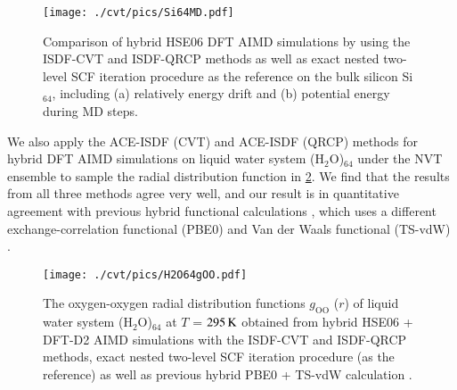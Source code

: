 \begin{figure}[htbp]
	\begin{center}
		\texttt{[image: ./cvt/pics/Si64MD.pdf]}
	\end{center}
	\caption{Comparison of hybrid HSE06 DFT AIMD simulations by using the 
	ISDF\hyp{}CVT and ISDF\hyp{}QRCP methods as well as exact nested 
	two\hyp{}level SCF iteration procedure as the reference on the bulk silicon
	Si$_{64}$, including (a) relatively energy drift and (b) potential energy
	during MD steps.} \label{fig:Si64MD}
\end{figure}
\FloatBarrier

We also apply the ACE\hyp{}ISDF (CVT) and ACE\hyp{}ISDF (QRCP) methods for
hybrid DFT AIMD simulations on liquid water system (H$_2$O)$_{64}$ under the NVT
ensemble to sample the radial distribution function in \cref{fig:H2O64gOO}. We
find that the results from all three methods agree very well, and our result is
in quantitative agreement with previous hybrid functional calculations
\cite{JCP_141_084502_2014}, which uses a different exchange\hyp{}correlation
functional (PBE0) and Van der Waals functional (TS\hyp{}vdW) 
\cite{PRL_102_073005_2009}.

\begin{figure}[htbp]
	\begin{center}
		\texttt{[image: ./cvt/pics/H2O64gOO.pdf]}
	\end{center}
	\caption{The oxygen\hyp{}oxygen radial distribution functions $g_\text{OO}$
	($r$) of liquid water system (H$_2$O)$_{64}$ at $T$ = $295\operatorname{K}$ obtained
	from hybrid HSE06 + DFT\hyp{}D2 AIMD simulations with the ISDF\hyp{}CVT and
	ISDF\hyp{}QRCP methods, exact nested two\hyp{}level SCF iteration procedure 
	(as the reference) as well as previous hybrid PBE0 + TS\hyp{}vdW calculation 
	\cite{JCP_141_084502_2014}.}\label{fig:H2O64gOO}
\end{figure}
\FloatBarrier